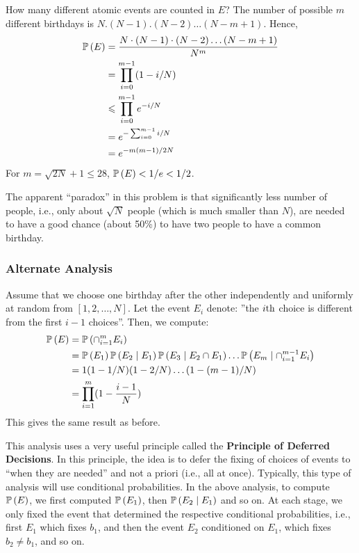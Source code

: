 How many different atomic events are counted in $E$?
The number of possible $m$ different birthdays is $N.(N-1).(N-2) \dots (N-m+1)$.
Hence,
\begin{align*}\operatorname{\mathbb{P}}\left(E\right)
     & = \frac{N\cdot(N-1)\cdot(N-2)\dots(N-m+1)}{N^m} \\
     & = \prod_{i=0}^{m-1}(1 - i/N)                    \\
     & \leqslant \prod_{i=0}^{m-1} e^{-i/N}                 \\
     & = e^{-\sum_{i=0}^{m-1} i/N}                     \\
     & = e^{-m(m-1)/2N}
\end{align*}
For $m = \sqrt{2N} + 1 \leq 28$, $\operatorname{\mathbb{P}}\left(E\right) < 1/e < 1/2$.

The apparent ``paradox'' in this problem is that significantly less number of people, i.e.,  only about $\sqrt{N}$ people (which is much smaller than $N$), are needed to have a good chance (about 50\%) to have two people to have a common birthday.

\subsubsection*{Alternate Analysis}
Assume that we choose one birthday after the other independently and uniformly at
random from $[1, 2, \dots, N]$.
Let the event $E_i$ denote: ''the $i\text{th}$ choice is different from the first $i-1$ choices''.
Then, we compute:
\begin{align*}\operatorname{\mathbb{P}}\left(E\right)
     & = \operatorname{\mathbb{P}}\left(\cap_{i=1}^mE_i\right)                                                                                     \\
     & = \operatorname{\mathbb{P}}\left(E_1\right) \operatorname{\mathbb{P}}\left(E_2 \mid E_1\right)\operatorname{\mathbb{P}}\left(E_3 \mid E_2 \cap E_1\right) \dots \operatorname{\mathbb{P}}\left(E_m \mid \cap_{i=1}^{m-1}E_i\right) \\
     & = 1 (1 - 1/N) (1 - 2/N) \dots (1 - (m-1)/N)                                                                  \\
     & = \prod_{i=1}^{m} (1 -\frac{i-1}{N})
\end{align*}
This gives the same result as before.

This analysis uses a very useful principle called the  \textbf{Principle of Deferred Decisions}. In this principle,
the idea is to defer the fixing of choices of events to ``when they are needed'' and not a priori (i.e., all at once).
Typically, this type of analysis will use conditional probabilities. In the above analysis, to compute $\operatorname{\mathbb{P}}\left(E\right)$,
we first computed $\operatorname{\mathbb{P}}\left(E_1\right)$, then $\operatorname{\mathbb{P}}\left(E_2 \mid E_1\right)$ and so on. At each stage, we only fixed the  event that
determined the respective conditional probabilities, i.e., first $E_1$ which fixes $b_1$, and then the event
$E_2$ conditioned on $E_1$, which fixes $b_2 \neq b_1$, and so on.














